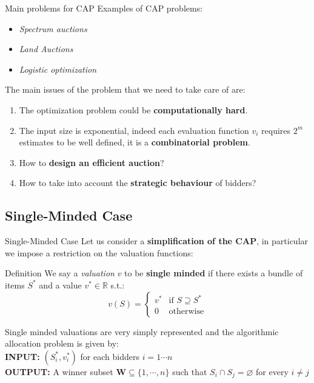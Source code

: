 \documentclass[aspectratio=169,xcolor=dvipsnames]{beamer}
\begin{document}
    \begin{frame}{Main problems for CAP}
    Examples of CAP problems:
    \begin{itemize}
        \item \textit{Spectrum auctions}
        \item \textit{Land Auctions}
        \item \textit{Logistic optimization}
    \end{itemize}
    \vspace{8pt}
    The main issues of the problem that we need to take care of are:
    \begin{enumerate}
        \item The optimization problem could be \textbf{computationally hard}.
        \item The input size is exponential, indeed each evaluation function $v_i$ requires $2^m$ estimates to be well defined, it is a \textbf{combinatorial problem}.
        \item How to \textbf{design an efficient auction}?
        \item How to take into account the \textbf{strategic behaviour} of bidders?
    \end{enumerate}
    \end{frame}
    
    \subsection{Single-Minded Case}
    \begin{frame}{Single-Minded Case}
    Let us consider a \textbf{simplification of the CAP}, in particular we impose a restriction on the valuation functions:
    \begin{block}{Definition}
    We say a \textit{valuation} $v$ to be \textbf{single minded} if there exists a bundle of items $S^*$ and a value $v^* \in \mathbb{R}$ s.t.:
    $$
        v(S)= 
    \begin{cases}
        v^* & \text{if } S\supseteq S^* \\
        0              & \text{otherwise}
    \end{cases}
    $$
    \end{block}
    \vspace{8pt}
    Single minded valuations are very simply represented and the algorithmic allocation problem is given by:\\ \vspace{3pt}
    \textbf{INPUT: } $(S^*_i, v^*_i)$ for each bidders $ i = 1 \cdots n$ \\
    \textbf{OUTPUT: } A winner subset $\boldsymbol{W} \subseteq \{1, \cdots ,n\}$ such that $S_i \cap S_j = \varnothing$ for every  $i \neq j$
    \end{frame}
    
\end{document}
